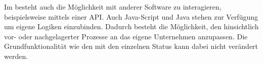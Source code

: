 Im \docdesk{} besteht auch die Möglichkeit mit anderer Software zu interagieren, beispielsweise mittels einer \acrshort{API}.
Auch Java-Script und Java stehen zur Verfügung um eigene Logiken einzubinden.
Dadurch besteht die Möglichkeit, den \docdesk{} hinsichtlich vor- oder nachgelagerter Prozesse an das eigene Unternehmen anzupassen.
Die Grundfunktionalität wie den  mit den einzelnen Status kann dabei nicht verändert werden.
